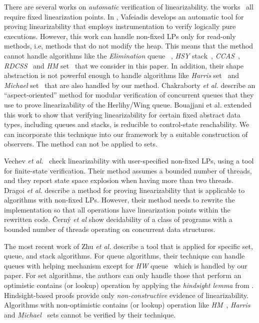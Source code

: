 There are several works on {\it automatic} verification of linearizability.
the works~\cite{AHHR:integrated,BLMRS:cav08,Vafeiadis:vmcai09}
all require fixed linearization points.
In \cite{Vafeiadis:cav10}, Vafeiadis
develops an automatic tool for proving  linearizability that
employs instrumentation to verify logically pure executions.
%
However, this work can handle non-fixed LPs only for read-only methods,
i.e, methods that do not modify the heap.
%
This means that the method cannot handle
 algorithms like the {\it Elimination} queue ~\cite{Shavit:ElimQueue}, {\it HSY} stack~\cite{HSYstack}, {\it CCAS}~\cite{Harris:CAS}, 
{\it RDCSS}~\cite{Harris:CAS} and {\it HM} set~\cite{ArtOfMpP} that we consider in this paper. In addition, their shape abstraction is not powerful enough to handle algorithms like {\it Harris} set~\cite{Harris:list} and {\it Michael} set~\cite{Michael:list} that are also handled by our method.
%
%
Chakraborty {\it et al.} \cite{HSV:concur13}
describe an ``aspect-oriented'' method for  modular verification 
of concurrent queues that they use to prove linearizability of the Herlihy/Wing queue.
Bouajjani et al. \cite{BEEH:icalp15} extended this work to show that verifying 
linearizability for certain
fixed abstract data types, including queues and stacks, is reducible to 
control-state reachability. 
%
We can incorporate this technique into
our framework by a suitable construction of observers.
The method can not be applied to sets.
%
  
%
Vechev {\it et al.}~\cite{Vechev:spin09}
check linearizability with user-specified non-fixed LPs,
using a tool for finite-state verification.
Their method assumes a bounded number of threads, and
they report state space explosion when having more than two threads.
%
Dragoi  {\it et al.} \cite{Henzinger:CAV13} describe a method for proving
linearizability that is applicable to algorithms with non-fixed LPs.
%
However, their method needs to rewrite the implementation so that all operations 
have linearization points within the rewritten code.
%
\v{C}ern{\'y} {\it et al} \cite{CernyRZCA:CAV10} show decidability of a class
of programs with a bounded number of threads operating on concurrent data structures.


The most recent work of Zhu {\it et al.} \cite{Poling}
describe a tool that is applied for specific set, queue, and stack  
algorithms. For queue algorithms, their technique can handle queues with helping mechanism except for {\it HW} queue~\cite{HeWi:linearizability} which is handled by our paper.
%
For set algorithms, the authors can only handle those that perform an optimistic contains (or lookup) operation by applying the {\it hindsight lemma} from 
\cite{OHearnlist}. 
%
Hindsight-based proofs provide only {\it non-constructive} 
evidence of linearizability. Algorithms with non-optimistic contains (or lookup) operation like {\it HM}~\cite{ArtOfMpP}, {\it Harris}~\cite{Harris:list} and {\it Michael}~\cite{Michael:list} sets cannot be verified by their technique.


